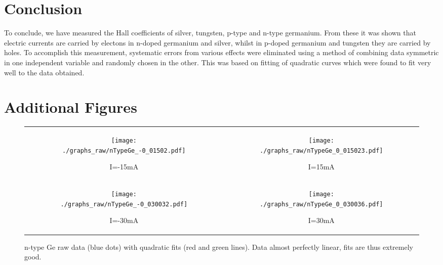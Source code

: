 \documentclass[a4paper]{article}
\begin{document}
	\section{Conclusion}
		To conclude, we have measured the Hall coefficients of silver, tungsten, p-type and n-type germanium. From these it was shown that electric currents are carried by electons in n-doped germanium and silver, whilst in p-doped germanium and tungsten they are carried by holes. To accomplish this measurement, systematic errors from various effects were eliminated using a method of combining data symmetric in one independent variable and randomly chosen in the other. This was based on fitting of quadratic curves which were found to fit very well to the data obtained.
	
	\newpage
	\appendix
	\section{Additional Figures} \label{sec:additionalFigures}
	
	\begin{figure}[h!]
		\centering
		\begin{tabular}{c|c}
			\begin{subfigure}[t]{0.45\textwidth}
				\centering
				\texttt{[image: ./graphs\_raw/nTypeGe\_-0\_01502.pdf]}
				\caption{I=-15mA}
				\label{fig:nTypeRawGraph-15mA}
			\end{subfigure}
			&
			\begin{subfigure}[t]{0.45\textwidth}
				\centering
				\texttt{[image: ./graphs\_raw/nTypeGe\_0\_015023.pdf]}
				\caption{I=15mA}
				\label{fig:nTypeRawGraph15mA}
			\end{subfigure}
			\\
			\begin{subfigure}[t]{0.45\textwidth}
				\centering
				\texttt{[image: ./graphs\_raw/nTypeGe\_-0\_030032.pdf]}
				\caption{I=-30mA}
				\label{fig:nTypeRawGraph-30mA}
			\end{subfigure}
			&
			\begin{subfigure}[t]{0.45\textwidth}
				\centering
				\texttt{[image: ./graphs\_raw/nTypeGe\_0\_030036.pdf]}
				\caption{I=30mA}
				\label{fig:nTypeRawGraph30mA}
			\end{subfigure}
		\end{tabular}
		\caption{n-type Ge raw data (blue dots) with quadratic fits (red and green lines). Data almost perfectly linear, fits are thus extremely good.}
		\label{fig:nTypeRawGraphs}
	\end{figure}
	
\end{document}

